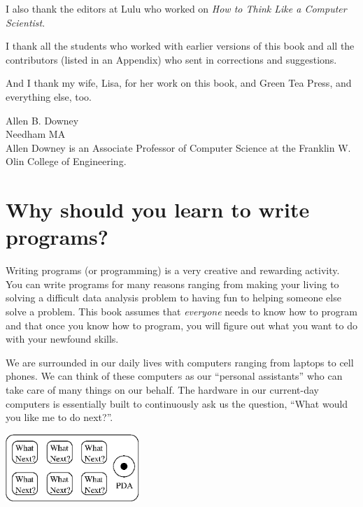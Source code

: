 \documentclass[10pt]{book}
\begin{document}

I also thank the editors at Lulu who worked on
\emph{How to Think Like a Computer Scientist}.

I thank all the students who worked with earlier
versions of this book and all the contributors (listed
in an Appendix) who sent in corrections and suggestions.

And I thank my wife, Lisa, for her work on this book, and Green
Tea Press, and everything else, too.

Allen B. Downey \\
Needham MA\\

Allen Downey is an Associate Professor of Computer Science at 
the Franklin W. Olin College of Engineering.


\clearemptydoublepage

\begin{latexonly}

\tableofcontents

\clearemptydoublepage

\end{latexonly}

\mainmatter

\chapter{Why should you learn to write programs?}

Writing programs (or programming) is a very creative 
and rewarding activity.  You can write programs for 
many reasons ranging from making your living to solving
a difficult data analysis problem to having fun to helping
someone else solve a problem.  This book assumes that 
\emph{everyone} needs to know how to program and that once 
you know how to program, you will figure out what you want 
to do with your newfound skills.  

We are surrounded in our daily lives with computers ranging 
from laptops to cell phones.  We can think of these computers
as our ``personal assistants'' who can take care of many things
on our behalf.  The hardware in our current-day computers 
is essentially built to continuously ask us the question, 
``What would you like me to do next?''.

\beforefig
\centerline{\includegraphics[height=1.00in]{figs2/pda.eps}}
\afterfig
\end{document}
